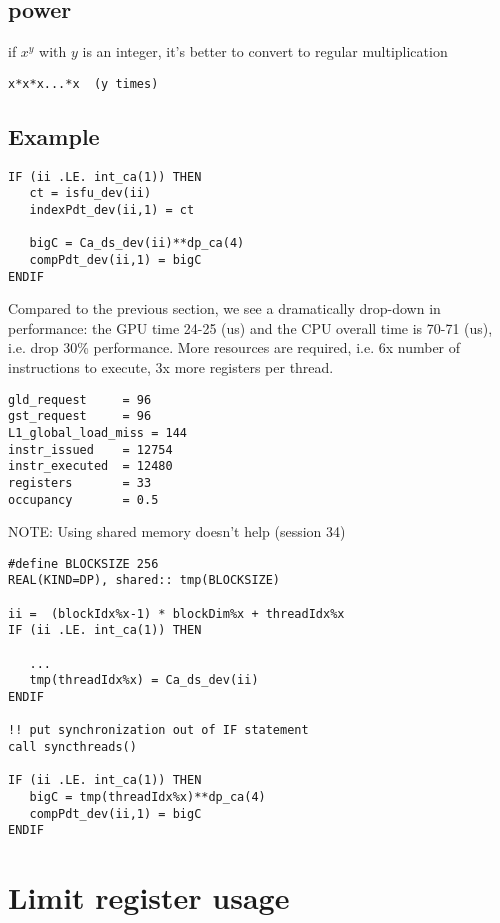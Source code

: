 \subsection{power}
\label{sec:power}

if $x^y$ with $y$ is an integer, it's better to convert to regular
multiplication
\begin{verbatim}
x*x*x...*x  (y times)
\end{verbatim}

\subsection{Example}
\label{sec:example}

\begin{verbatim}
IF (ii .LE. int_ca(1)) THEN
   ct = isfu_dev(ii)
   indexPdt_dev(ii,1) = ct

   bigC = Ca_ds_dev(ii)**dp_ca(4)
   compPdt_dev(ii,1) = bigC
ENDIF
\end{verbatim}
Compared to the previous section, we see a dramatically drop-down in
performance: the GPU time 24-25 (us) and the CPU overall time is 70-71
(us), i.e. drop 30\% performance. More resources are required, i.e. 6x
number of instructions to execute, 3x more registers per thread. 
\begin{verbatim}
gld_request     = 96 
gst_request     = 96 
L1_global_load_miss = 144 
instr_issued    = 12754
instr_executed  = 12480
registers       = 33
occupancy       = 0.5
\end{verbatim}

NOTE: Using shared memory doesn't help (session 34)
\begin{verbatim}
#define BLOCKSIZE 256
REAL(KIND=DP), shared:: tmp(BLOCKSIZE)   

ii =  (blockIdx%x-1) * blockDim%x + threadIdx%x
IF (ii .LE. int_ca(1)) THEN

   ...
   tmp(threadIdx%x) = Ca_ds_dev(ii)
ENDIF

!! put synchronization out of IF statement
call syncthreads()

IF (ii .LE. int_ca(1)) THEN   
   bigC = tmp(threadIdx%x)**dp_ca(4)
   compPdt_dev(ii,1) = bigC
ENDIF
\end{verbatim}

\section{Limit register usage}
\label{sec:limit-register-usage}

